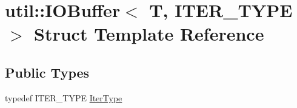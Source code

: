 \hypertarget{structutil_1_1IOBuffer}{\section{util\-:\-:I\-O\-Buffer$<$ T, I\-T\-E\-R\-\_\-\-T\-Y\-P\-E $>$ Struct Template Reference}
\label{structutil_1_1IOBuffer}
}
\subsection*{Public Types}
\begin{DoxyCompactItemize}
\item 
typedef I\-T\-E\-R\-\_\-\-T\-Y\-P\-E \hyperlink{structutil_1_1IOBuffer_aa942c705a66498986a60878c9fc125c0}{Iter\-Type}
\end{DoxyCompactItemize}
